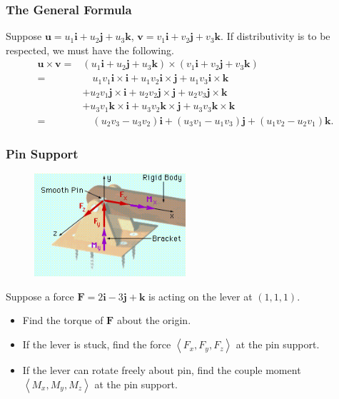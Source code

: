 \documentclass[10pt]{beamer}
\newcommand{\inpr}[1]{\left\langle#1\right\rangle}
\begin{document}
\begin{frame}
\frametitle{The General Formula}
Suppose $\mathbf u = u_1\mathbf i + u_2\mathbf j + u_3\mathbf k$, $\mathbf v = v_1\mathbf i + v_2\mathbf j + v_3\mathbf k$. If distributivity is to be respected, we must have the following.\pause
\begin{align*}
\mathbf u \times \mathbf v =& \left(u_1\mathbf i + u_2\mathbf j + u_3\mathbf k\right)\times \left(  v_1\mathbf i + v_2\mathbf j + v_3\mathbf k\right)\\
=&\quad u_1v_1\mathbf i\times\mathbf i + u_1v_2\mathbf i\times\mathbf j + u_1v_3\mathbf i\times\mathbf k\\
&+u_2v_1 \mathbf j\times\mathbf i  + u_2v_2 \mathbf j\times\mathbf j + u_2v_3 \mathbf j\times\mathbf k\\
&+u_3v_1 \mathbf k\times\mathbf i + u_3v_2\mathbf k\times\mathbf j + u_3v_3\mathbf k\times\mathbf k\\
=&\quad (u_2v_3 - u_3v_2)\mathbf i + (u_3v_1 - u_1v_3)\mathbf j + (u_1v_2 - u_2v_1)\mathbf k.
\end{align*}
\end{frame}

\begin{frame}
\frametitle{Pin Support}
\begin{figure}[h]
\includegraphics[width = 0.5\textwidth]{pinSupport.jpg}
\end{figure}
Suppose a force $\mathbf F = 2\mathbf i - 3\mathbf j + \mathbf k$ is acting on the lever at $(1,1,1)$. 
\begin{itemize}[label = $\bullet$]
\item
Find the torque of $\mathbf  F$ about the origin.
\item If the lever is stuck, find the force $\inpr{F_x, F_y, F_z}$ at the pin support.
\item If the lever can rotate freely about pin, find the couple moment $\inpr{M_x, M_y, M_z}$ at the pin support.
\end{itemize}
\end{frame}
\end{document}
